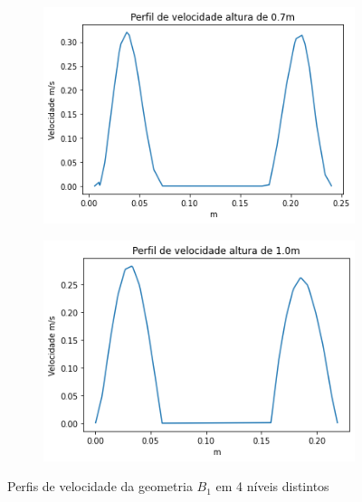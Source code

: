 \begin{figure}[H]
    	\begin{subfigure}[b]{0.42\linewidth}
    		\includegraphics[width=\linewidth]{img/perfil_vel/rugoso/perfil_velocidade_rugoso_700.png}
    	\end{subfigure}
    	\begin{subfigure}[b]{0.42\linewidth}
    		\includegraphics[width=\linewidth]{img/perfil_vel/rugoso/perfil_velocidade_rugoso_1000.png}
    	\end{subfigure}
    	\caption{Perfis de velocidade da geometria $B_1$ em 4 níveis distintos}
    	\label{fig:perfil_velocidade_rugosa}
    \end{figure}
    
